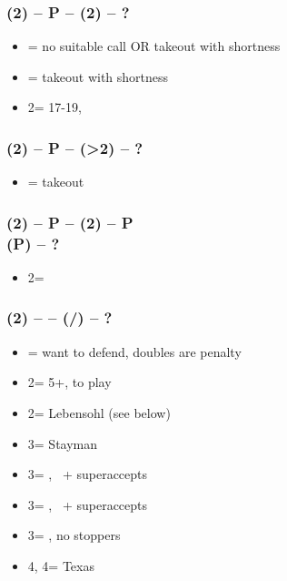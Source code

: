 \documentclass[12pt, a4paper]{report}
\begin{document}
        \subsubsection*{(2\diams) -- P -- (2\spades) -- ?}
        \begin{itemize}
            \item \pass = no suitable call OR takeout with \hearts shortness \imp
            \item \dbl = takeout with \spades shortness \imp
            \item 2\nt = 17-19, \bal
        \end{itemize}

        \subsubsection*{(2\diams) -- P -- (>2\spades) -- ?}
        \begin{itemize}
            \item \dbl = takeout \imp
        \end{itemize}

        \subsubsection*{(2\diams) -- P -- (2\hearts) -- P \\
                        (P) -- ?}        
        \begin{itemize}
            \item 2\nt = \minor
        \end{itemize}

        \subsubsection*{(2\diams) -- \dbl -- (\rdbl/\pass) -- ?}        
        \begin{itemize}
            \item \pass = want to defend, doubles are penalty
            \item 2\major = 5+\major, to play
            \item 2\nt = Lebensohl (see below)
            \item 3\clubs = Stayman \vimp
            \item 3\diams = \trsf{\hearts}, \gf\ + superaccepts
            \item 3\hearts = \trsf{\spades}, \gf\ + superaccepts
            \item 3\spades = \trsf{\nt}, no \major stoppers
            \item 4\diams, 4\hearts = Texas
        \end{itemize}
\end{document}
